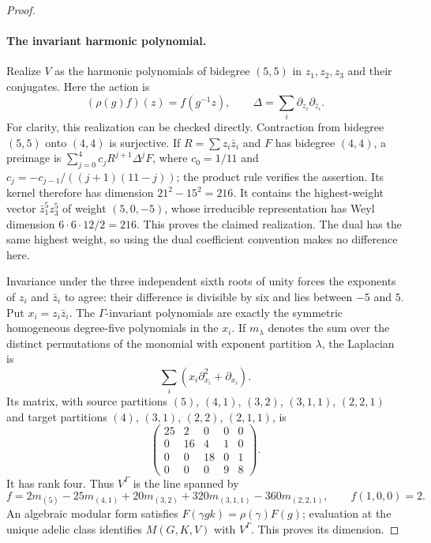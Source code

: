 \begin{proof}
\paragraph{The invariant harmonic polynomial.}
Realize $V$ as the harmonic polynomials of bidegree $(5,5)$ in
$z_1,z_2,z_3$ and their conjugates.  Here the action is
\[
       (\rho(g)f)(z)=f(g^{-1}z),\qquad
       \Delta=\sum_i\partial_{z_i}\partial_{\overline z_i}.
 \tag{UH.4}
\]
For clarity, this realization can be checked directly.  Contraction
from bidegree $(5,5)$ onto $(4,4)$ is surjective.  If $R=\sum z_i\bar z_i$
and $F$ has bidegree $(4,4)$, a preimage is
$\sum_{j=0}^4 c_jR^{j+1}\Delta^jF$, where
$c_0=1/11$ and $c_j=-c_{j-1}/((j+1)(11-j))$; the product rule verifies
the assertion.  Its kernel therefore has dimension $21^2-15^2=216$.
It contains the highest-weight vector $\bar z_1^5z_3^5$ of weight
$(5,0,-5)$, whose irreducible representation has Weyl dimension
$6\cdot6\cdot12/2=216$.  This proves the claimed realization.  The
dual has the same highest weight, so using the dual coefficient
convention makes no difference here.

Invariance under the three independent sixth roots of unity forces
the exponents of $z_i$ and $\bar z_i$ to agree: their difference is
divisible by six and lies between $-5$ and $5$.  Put $x_i=z_i\bar z_i$.
The $\Gamma$-invariant polynomials are exactly the symmetric
homogeneous degree-five polynomials in the $x_i$.  If $m_\lambda$
denotes the sum over the distinct permutations of the monomial with
exponent partition $\lambda$, the Laplacian is
\[
 \sum_i(x_i\partial_{x_i}^2+\partial_{x_i}).
\]
Its matrix, with source partitions $(5)$, $(4,1)$, $(3,2)$,
$(3,1,1)$, $(2,2,1)$ and target partitions $(4)$, $(3,1)$,
$(2,2)$, $(2,1,1)$, is
\[
 \begin{pmatrix}
 25&2&0&0&0\\
 0&16&4&1&0\\
 0&0&18&0&1\\
 0&0&0&9&8
 \end{pmatrix}.
 \tag{UH.5}
\]
It has rank four.  Thus $V^\Gamma$ is the line spanned by
\[
 f=2m_{(5)}-25m_{(4,1)}+20m_{(3,2)}
       +320m_{(3,1,1)}-360m_{(2,2,1)},
 \qquad f(1,0,0)=2.
 \tag{UH.6}
\]
An algebraic modular form satisfies
$F(\gamma gk)=\rho(\gamma)F(g)$; evaluation at the unique adelic
class identifies $M(G,K,V)$ with $V^\Gamma$.  This proves its dimension.


\end{proof}
